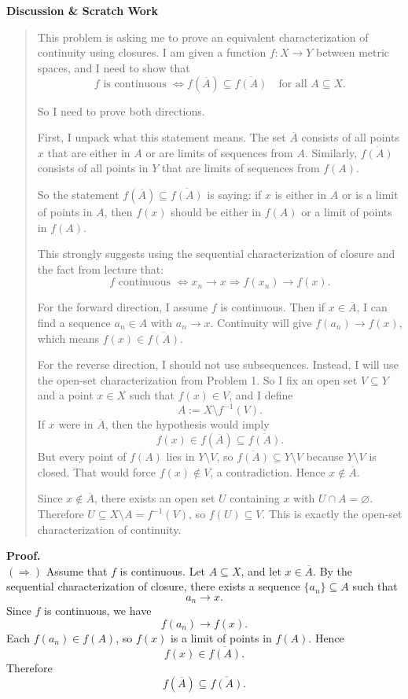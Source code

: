 \documentclass[12pt]{article}
\newenvironment{scratch}{%
  \par\smallskip
  \noindent\textbf{Discussion \& Scratch Work}\begin{quote}\small
}{%
  \end{quote}\smallskip
}
\begin{document}
\begin{scratch}
This problem is asking me to prove an equivalent characterization of continuity using closures. I am given a function $f:X\to Y$ between metric spaces, and I need to show that
\[
f \text{ is continuous } \iff f(\overline{A}) \subseteq \overline{f(A)} \quad \text{for all } A\subseteq X.
\]

So I need to prove both directions.

First, I unpack what this statement means. The set $\overline{A}$ consists of all points $x$ that are either in $A$ or are limits of sequences from $A$. Similarly, $\overline{f(A)}$ consists of all points in $Y$ that are limits of sequences from $f(A)$.

So the statement $f(\overline{A}) \subseteq \overline{f(A)}$ is saying:
if $x$ is either in $A$ or is a limit of points in $A$, then $f(x)$ should be either in $f(A)$ or a limit of points in $f(A)$.

This strongly suggests using the sequential characterization of closure and the fact from lecture that:
\[
f \text{ continuous } \iff x_n \to x \Rightarrow f(x_n)\to f(x).
\]

For the forward direction, I assume $f$ is continuous. Then if $x\in \overline{A}$, I can find a sequence $a_n\in A$ with $a_n\to x$. Continuity will give $f(a_n)\to f(x)$, which means $f(x)\in \overline{f(A)}$.

For the reverse direction, I should not use subsequences. Instead, I will use the open-set characterization from Problem 1. So I fix an open set $V\subseteq Y$ and a point $x\in X$ such that $f(x)\in V$, and I define
\[
A:=X\setminus f^{-1}(V).
\]
If $x$ were in $\overline{A}$, then the hypothesis would imply
\[
f(x)\in f(\overline{A})\subseteq \overline{f(A)}.
\]
But every point of $f(A)$ lies in $Y\setminus V$, so $\overline{f(A)}\subseteq Y\setminus V$ because $Y\setminus V$ is closed. That would force $f(x)\notin V$, a contradiction. Hence $x\notin \overline{A}$.

Since $x\notin \overline{A}$, there exists an open set $U$ containing $x$ with $U\cap A=\varnothing$. Therefore $U\subseteq X\setminus A=f^{-1}(V)$, so $f(U)\subseteq V$. This is exactly the open-set characterization of continuity.
\end{scratch}

\textbf{Proof.}\\
$(\Rightarrow)$ Assume that $f$ is continuous. Let $A\subseteq X$, and let $x\in \overline{A}$. By the sequential characterization of closure, there exists a sequence $\{a_n\}\subseteq A$ such that
\[
a_n \to x.
\]
Since $f$ is continuous, we have
\[
f(a_n)\to f(x).
\]
Each $f(a_n)\in f(A)$, so $f(x)$ is a limit of points in $f(A)$. Hence
\[
f(x)\in \overline{f(A)}.
\]
Therefore
\[
f(\overline{A}) \subseteq \overline{f(A)}.
\]
\end{document}
